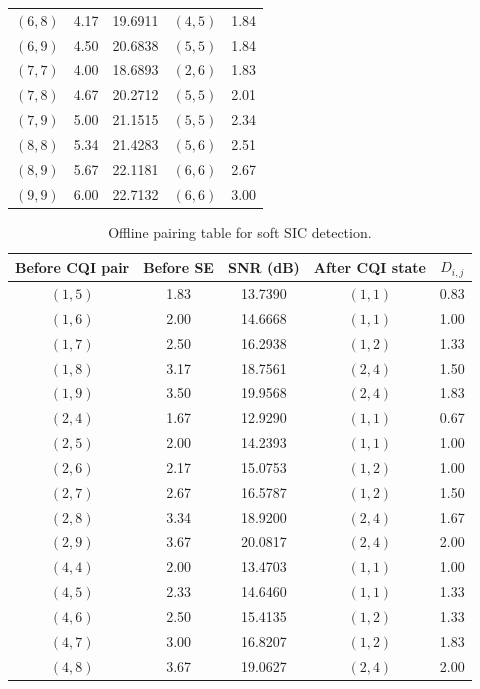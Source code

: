 \begin{table}[p]
\begin{tabular}{@{}ccccc@{}}
$(6,8)$ & 4.17 & 19.6911 & $(4,5)$ & 1.84 \\
$(6,9)$ & 4.50 & 20.6838 & $(5,5)$ & 1.84 \\
$(7,7)$ & 4.00 & 18.6893 & $(2,6)$ & 1.83 \\
$(7,8)$ & 4.67 & 20.2712 & $(5,5)$ & 2.01 \\
$(7,9)$ & 5.00 & 21.1515 & $(5,5)$ & 2.34 \\
$(8,8)$ & 5.34 & 21.4283 & $(5,6)$ & 2.51 \\
$(8,9)$ & 5.67 & 22.1181 & $(6,6)$ & 2.67 \\
$(9,9)$ & 6.00 & 22.7132 & $(6,6)$ & 3.00 \\
\bottomrule
\end{tabular}
\end{table}

\begin{table}[p]
\centering
\normalsize
\setlength{\tabcolsep}{6pt}
\renewcommand{\arraystretch}{1.2}
\caption{Offline pairing table for soft SIC detection.}
\label{tab:sic-offline-pairing}
\begin{tabular}{@{}ccccc@{}}
\toprule
Before CQI pair & Before SE & SNR (dB) & After CQI state & $D_{i,j}$ \\
\midrule
$(1,5)$ & 1.83 & 13.7390 & $(1,1)$ & 0.83 \\
$(1,6)$ & 2.00 & 14.6668 & $(1,1)$ & 1.00 \\
$(1,7)$ & 2.50 & 16.2938 & $(1,2)$ & 1.33 \\
$(1,8)$ & 3.17 & 18.7561 & $(2,4)$ & 1.50 \\
$(1,9)$ & 3.50 & 19.9568 & $(2,4)$ & 1.83 \\
$(2,4)$ & 1.67 & 12.9290 & $(1,1)$ & 0.67 \\
$(2,5)$ & 2.00 & 14.2393 & $(1,1)$ & 1.00 \\
$(2,6)$ & 2.17 & 15.0753 & $(1,2)$ & 1.00 \\
$(2,7)$ & 2.67 & 16.5787 & $(1,2)$ & 1.50 \\
$(2,8)$ & 3.34 & 18.9200 & $(2,4)$ & 1.67 \\
$(2,9)$ & 3.67 & 20.0817 & $(2,4)$ & 2.00 \\
$(4,4)$ & 2.00 & 13.4703 & $(1,1)$ & 1.00 \\
$(4,5)$ & 2.33 & 14.6460 & $(1,1)$ & 1.33 \\
$(4,6)$ & 2.50 & 15.4135 & $(1,2)$ & 1.33 \\
$(4,7)$ & 3.00 & 16.8207 & $(1,2)$ & 1.83 \\
$(4,8)$ & 3.67 & 19.0627 & $(2,4)$ & 2.00 \\

\end{tabular}
\end{table}
